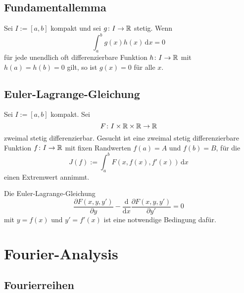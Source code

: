 \subsection{Fundamentallemma}

Sei $I:=[a,b]$ kompakt und sei $g\colon I\to\mathbb R$
stetig. Wenn 
\begin{equation}
\int_a^b g(x)h(x)\,\mathrm dx=0
\end{equation}
für jede unendlich oft differenzierbare Funktion $h\colon I\to\mathbb R$
mit $h(a)=h(b)=0$ gilt, so ist $g(x)=0$ für alle $x$.

\subsection{Euler-Lagrange-Gleichung}

Sei $I:=[a,b]$ kompakt. Sei
\begin{equation}
F\colon I\times\mathbb R\times\mathbb R\to\mathbb R
\end{equation}
zweimal stetig differenzierbar. Gesucht ist eine zweimal
stetig differenzierbare Funktion $f\colon I\to\mathbb R$ mit fixen
Randwerten $f(a)=A$ und $f(b)=B$, für die
\begin{equation}
J(f) := \int_a^b F(x,f(x),f'(x))\,\mathrm dx
\end{equation}
einen Extremwert annimmt.

Die Euler-Lagrange-Gleichung
\begin{equation}
\frac{\partial F(x,y,y')}{\partial y}
-\frac{\mathrm d}{\mathrm dx}\frac{\partial F(x,y,y')}{\partial y'}
=0
\end{equation}
mit $y=f(x)$ und $y'=f'(x)$ ist eine notwendige Bedingung dafür.

\newpage
\section{Fourier-Analysis}
\subsection{Fourierreihen}
